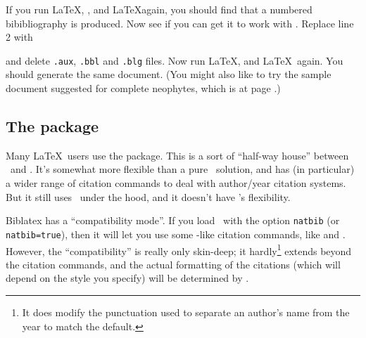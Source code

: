 If you run \LaTeX, \bibtex, and \LaTeX again, you should find that a numbered bibibliography is produced. Now see if you can get it to work with . Replace line 2 with
\begin{center}
\end{center}
and delete \verb|.aux|, \verb|.bbl| and \verb|.blg| files. Now run \LaTeX,  and \LaTeX\ again. You should generate the same document. (You might also like to try the sample document suggested for complete neophytes, which is at page \pageref{neophyte:example}.)

\subsection{The  package}

Many \LaTeX\ users use the  package. This is a sort of ``half-way house'' between \bibtex\ and \biblatex. It's somewhat more flexible than a pure \bibtex\ solution, and has (in particular) a wider range of citation commands to deal with author\slash year citation systems. But it still uses \bibtex\ under the hood, and it doesn't have \biblatex's flexibility.

Biblatex has a  ``compatibility mode''. If you load \biblatex\ with the option \texttt{natbib} (or \texttt{natbib\allowbreak =\allowbreak true}), then it will let you use some -like citation commands, like  and . However, the ``compatibility'' is really only skin-deep; it hardly\footnote{It does modify the punctuation used to separate an author's name from the year to match the  default.} extends beyond the citation commands, and the actual formatting of the citations (which will depend on the style you specify) will be determined by \biblatex.
